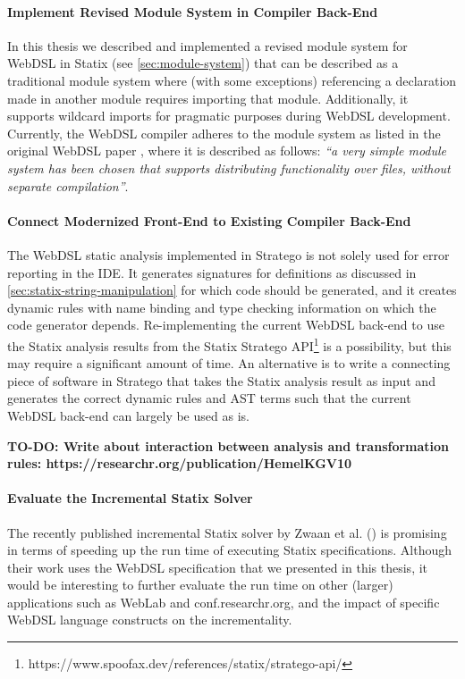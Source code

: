   \paragraph{Implement Revised Module System in Compiler Back-End} In this thesis we described and implemented a revised module system for WebDSL in Statix (see \cref{sec:module-system}) that can be described as a traditional module system where (with some exceptions) referencing a declaration made in another module requires importing that module. Additionally, it supports wildcard imports for pragmatic purposes during WebDSL development. Currently, the WebDSL compiler adheres to the module system as listed in the original WebDSL paper \autocite{Visser2007}, where it is described as follows: \textit{``a very simple module system has been chosen that supports distributing functionality over files, without separate compilation''}. 

  \paragraph{Connect Modernized Front-End to Existing Compiler Back-End} The WebDSL static analysis implemented in Stratego is not solely used for error reporting in the IDE. It generates signatures for definitions as discussed in \cref{sec:statix-string-manipulation} for which code should be generated, and it creates dynamic rules with name binding and type checking information on which the code generator depends. Re-implementing the current WebDSL back-end to use the Statix analysis results from the Statix Stratego API\footnote{https://www.spoofax.dev/references/statix/stratego-api/} is a possibility, but this may require a significant amount of time. An alternative is to write a connecting piece of software in Stratego that takes the Statix analysis result as input and generates the correct dynamic rules and AST terms such that the current WebDSL back-end can largely be used as is.

  \textbf{TO-DO: Write about interaction between analysis and transformation rules: https://researchr.org/publication/HemelKGV10}

  \paragraph{Evaluate the Incremental Statix Solver} The recently published incremental Statix solver by Zwaan et al. (\citeyear{ZwaanAV22}) is promising in terms of speeding up the run time of executing Statix specifications. Although their work uses the WebDSL specification that we presented in this thesis, it would be interesting to further evaluate the run time on other (larger) applications such as WebLab and conf.researchr.org, and the impact of specific WebDSL language constructs on the incrementality.
